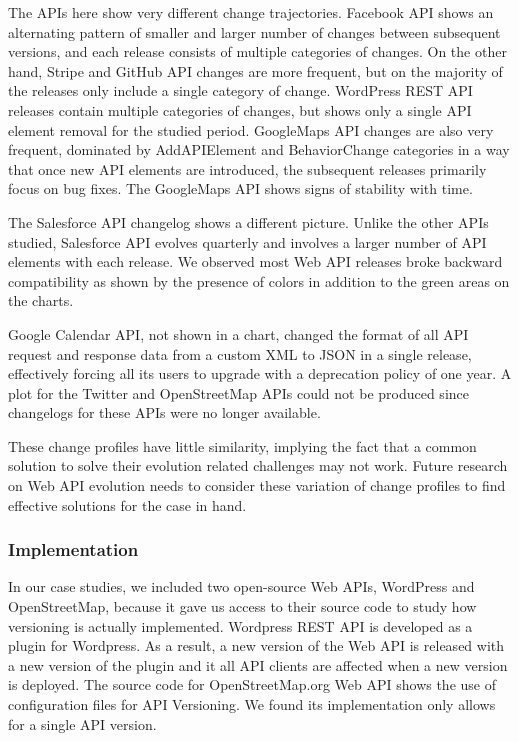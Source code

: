 \documentclass[conference]{IEEEtran}
\begin{document}
The APIs here show very different change trajectories. Facebook API shows an alternating pattern of smaller and larger number of changes between subsequent versions, and each release consists of multiple categories of changes. On the other hand, Stripe and GitHub API changes are more frequent, but on the majority of the releases only include a single category of change. WordPress REST API releases contain multiple categories of changes, but shows only a single API element removal for the studied period. GoogleMaps API changes are also very frequent, dominated by AddAPIElement and BehaviorChange categories in a way that once new API elements are introduced, the subsequent releases primarily focus on bug fixes. The GoogleMaps API shows signs of stability with time.

The Salesforce API changelog shows a different picture. Unlike the other APIs studied, Salesforce API evolves quarterly and involves a larger number of API elements with each release. We observed most Web API releases broke backward compatibility as shown by the presence of colors in addition to the green areas on the charts.

Google Calendar API, not shown in a chart, changed the format of all API request and response data from a custom XML to JSON in a single release, effectively forcing all its users to upgrade with a deprecation policy of one year. A plot for the Twitter and OpenStreetMap APIs could not be produced since changelogs for these APIs were no longer available.

These change profiles have little similarity, implying the fact that a common solution to solve their evolution related challenges may not work. Future research on Web API evolution needs to consider these variation of change profiles to find effective solutions for the case in hand.

\subsubsection{Implementation} %
\label{ssub:implementation}

In our case studies, we included two open-source Web APIs, WordPress and OpenStreetMap, because it gave us access to  their source code to study how versioning is actually implemented. Wordpress REST API is developed as a plugin for Wordpress. As a result, a new version of the Web API is released with a new version of the plugin and it all API clients are affected when a new version is deployed. The source code for OpenStreetMap.org Web API shows the use of configuration files for API Versioning. We found its implementation only allows for a single API version.
\end{document}
